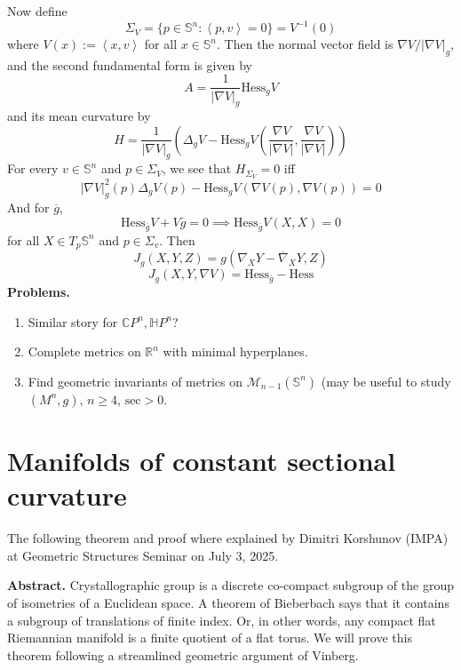 \bigskip
Now define
$$
\Sigma_V=\{p\in\mathbb{S}^n:\left\langle{}p,v\right\rangle{}=
0\}=V^{-1}(0)
$$
where $V(x):=\left\langle{}x,v\right\rangle{}$ for all
$x\in\mathbb{S}^n$. Then the normal
vector field is $\nabla V/|\nabla V|_g$, and
the second fundamental form is
given by
$$
A=\frac{1}{|\nabla V|_g}\text{Hess}_gV
$$
and its mean curvature by
\begin{equation}
\label{equation-mean-curva-level-sets-V}
H=\frac{1}{|\nabla
V|_g}\left(\Delta_gV-\text{Hess}
_gV\left(\frac{\nabla
V}{|\nabla V|},\frac{\nabla V}{|\nabla
V|}\right)\right)
\end{equation}
For every $v \in \mathbb{S}^n$ and
$p\in\Sigma_V$, we see that $H_{\Sigma_V}=0$
iff
$$
|\nabla
V|^2_g(p)\Delta_gV(p)-\text{Hess}_gV(\nabla
V(p),\nabla V(p))=0
$$
And for $\overline{g}$,
$$
\text{Hess}_{\overline{g}}V+V\overline{g}=
0\implies
\text{Hess}_{\overline{g}}V(X,X)=0
$$
for all $X\in T_p\mathbb{S}^n$ and
$p\in\Sigma_v$. Then
$$
J_g(X,Y,Z)=g(\nabla_XY-\overline{\nabla}_XY,
Z)
$$
$$
J_g(X,Y,\nabla
V)=\text{Hess}_{\overline{g}}-\text{Hess}
$$
{\bf Problems.}
\begin{enumerate}
\item Similar story for
$\mathbb{C}P^{n},\mathbb{H}P^n$?
\item Complete metrics on $\mathbb{R}^n$ with
minimal hyperplanes.
\item Find geometric invariants of metrics on
$\mathcal{M}_{n-1}(\mathbb{S}^n)$
(may be useful to study $(M^n,g)$, $n\geq 4$,
$\text{sec}>0$.
\end{enumerate}

\section{Manifolds of constant sectional
curvature}
\label{section-manif-const-secti-curva}

The following theorem and proof where
explained by Dimitri Korshunov (IMPA) at
Geometric Structures Seminar on July 3, 2025.

{\bf Abstract.} Crystallographic group is a
discrete co-compact subgroup of the
group of isometries of a Euclidean space. A
theorem of Bieberbach says that it
contains a subgroup of translations of finite
index. Or, in other words, any
compact flat Riemannian manifold is a finite
quotient of a flat torus. We will
prove this theorem following a streamlined
geometric argument of Vinberg.


